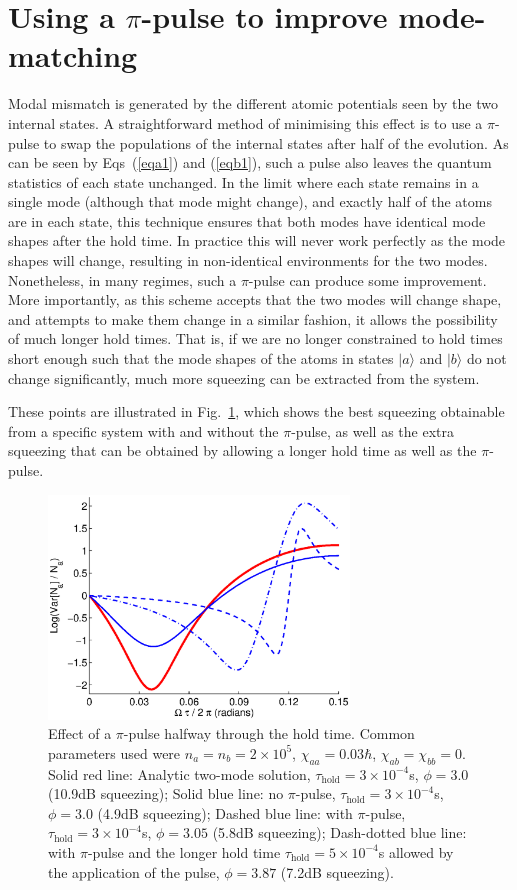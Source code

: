 \documentclass{iopart}
\begin{document}
\section{Using a $\pi$-pulse to improve mode-matching}
Modal mismatch is generated by the different atomic potentials seen by the two internal states.  A straightforward method of minimising this effect is to use a $\pi$-pulse to swap the populations of the internal states after half of the evolution. As can be seen by Eqs~(\ref{eqa1}) and (\ref{eqb1}), such a pulse also leaves the quantum statistics of each state unchanged. In the limit where each state remains in a single mode (although that mode might change), and exactly half of the atoms are in each state, this technique ensures that both modes have identical mode shapes after the hold time. In practice this will never work perfectly as the mode shapes will change, resulting in non-identical environments for the two modes. Nonetheless, in many regimes, such a $\pi$-pulse can produce some improvement. More importantly, as this scheme accepts that the two modes will change shape, and attempts to make them change in a similar fashion, it allows the possibility of much longer hold times. That is, if we are no longer constrained to hold times short enough such that the mode shapes of the atoms in states $|a \rangle$ and $|b \rangle$ do not change significantly, much more squeezing can be extracted from the system.

These points are illustrated in Fig.~\ref{piPulseFig}, which shows the best squeezing obtainable from a specific system with and without the $\pi$-pulse, as well as the extra squeezing that can be obtained by allowing a longer hold time as well as the $\pi$-pulse.
\begin{figure}
    \centering
    \includegraphics[width=8cm]{figures/pi_pulse.eps}
    \caption{Effect of a $\pi$-pulse halfway through the hold time. Common parameters used were $n_a = n_b =2 \times 10^5$, $\chi_{aa}=0.03\hbar$, $\chi_{ab}=\chi_{bb}=0$. Solid red line: Analytic two-mode solution, $\tau_{\mathrm{hold}}=3\times 10^{-4}$s, $\phi=3.0$ (10.9dB squeezing); Solid blue line: no $\pi$-pulse, $\tau_{\mathrm{hold}}=3\times 10^{-4}$s, $\phi=3.0$ (4.9dB squeezing);  Dashed blue line: with $\pi$-pulse, $\tau_{\mathrm{hold}}=3\times 10^{-4}$s, $\phi=3.05$ (5.8dB squeezing); Dash-dotted blue line: with $\pi$-pulse and the longer hold time $\tau_{\mathrm{hold}}=5\times 10^{-4}$s allowed by the application of the pulse, $\phi=3.87$ (7.2dB squeezing).}
    \label{piPulseFig}
\end{figure}
\end{document}
